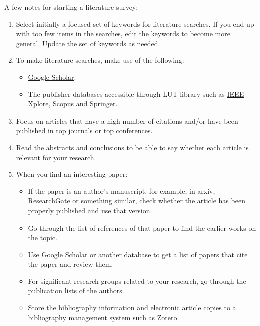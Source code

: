 \documentclass[11pt,a4,notitlepage]{article}
\begin{document}
A few notes for starting a literature survey:
%
\begin{enumerate}
%
\item Select initially a focused set of keywords for literature searches. If you
end up with too few items in the searches, edit the keywords to become more
general. Update the set of keywords as needed.
%
\item To make literature searches, make use of the following:
%
\begin{itemize}
%
\item \href{http://scholar.google.com}{Google Scholar}.
%
\item The publisher databases accessible through LUT library such as
\href{https://ieeexplore.ieee.org/}{IEEE Xplore},
\href{http://www.scopus.com/home.url}{Scopus} and
\href{https://link.springer.com/}{Springer}.
%
\end{itemize}
%
\item Focus on articles that have a high number of citations and/or have been
published in top journals or top conferences.
%
\item Read the abstracts and conclusions to be able to say whether each article
is relevant for your research.
%
\item When you find an interesting paper:
%
\begin{itemize}
%
\item If the paper is an author's manuscript, for example, in arxiv,
ResearchGate or something similar, check whether the article has been properly
published and use that version.
%
\item Go through the list of references of that paper to find the earlier works
on the topic.
%
\item Use Google Scholar or another database to get a list of papers that cite
the paper and review them.
%
\item For significant research groups related to your research, go through the
publication lists of the authors.
%
\item Store the bibliography information and electronic article copies to a
bibliography management system such as \href{http://www.zotero.org/}{Zotero}.
%
\end{itemize}
%
\end{enumerate}
\end{document}
